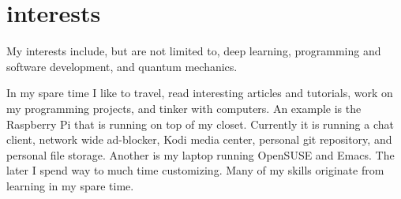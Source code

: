\documentclass[]{twentysecondcv}
\begin{document}






\makeprofile


\section{interests}
My interests include, but are not limited to, deep learning,
programming and software development, and quantum mechanics.

In my spare time I like to travel, read interesting articles and
tutorials, work on my programming projects, and
tinker with computers. An example is the Raspberry Pi that is running on
top of my closet. Currently it is  running a chat client, network wide ad-blocker, Kodi
media center, personal git repository, and personal file storage. Another is my
laptop running OpenSUSE and Emacs. The later I spend way to much time
customizing. Many of my skills originate from learning in
my spare time.
\end{document}
